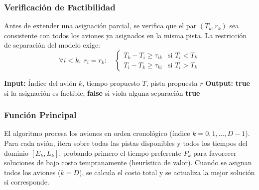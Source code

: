 \documentclass[12pt]{article}
\begin{document}
\subsubsection{Verificación de Factibilidad}

Antes de extender una asignación parcial, se verifica que el par $(T_k, r_k)$ sea consistente con todos los aviones ya asignados en la misma pista. La restricción de separación del modelo exige:
$$
\forall i < k,\; r_i = r_k:\quad
\begin{cases}
T_k - T_i \geq \tau_{ik} & \text{si } T_i < T_k \\
T_i - T_k \geq \tau_{ki} & \text{si } T_i > T_k
\end{cases}
$$

\begin{algorithm}[H]
\vspace{2mm}
\textbf{Input:} Índice del avión $k$, tiempo propuesto $T$, pista propuesta $r$\;
\textbf{Output:} \textbf{true} si la asignación es factible, \textbf{false} si viola alguna separación\;
\BlankLine
{}
\Return \textbf{true}\;
\vspace{2mm}
\caption{es\_factible}
\end{algorithm}

\subsubsection{Función Principal}

El algoritmo procesa los aviones en orden cronológico (índice $k = 0, 1, \dots, D-1$). Para cada avión, itera sobre todas las pistas disponibles y todos los tiempos del dominio $[E_k, L_k]$, probando primero el tiempo preferente $P_k$ para favorecer soluciones de bajo costo tempranamente (heurística de valor). Cuando se asignan todos los aviones ($k = D$), se calcula el costo total y se actualiza la mejor solución si corresponde.
\end{document}
